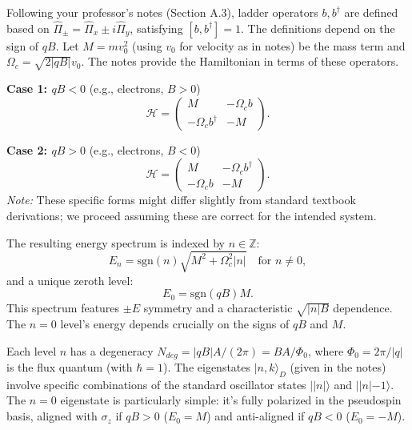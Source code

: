 \documentclass[11pt]{article}
\newcommand{\sgn}{\text{sgn}}
\newcommand{\Hc}{\mathcal{H}}       %
\begin{document}
Following your professor's notes (Section A.3), ladder operators $b, b^\dagger$ are defined based on $\hat{\Pi}_{\pm} = \hat{\Pi}_x \pm i \hat{\Pi}_y$, satisfying $[b, b^\dagger]=1$. The definitions depend on the sign of $qB$. Let $M = mv_0^2$ (using $v_0$ for velocity as in notes) be the mass term and $\Omega_c = \sqrt{2|qB|}v_0$. The notes provide the Hamiltonian in terms of these operators.

\textbf{Case 1: $qB < 0$} (e.g., electrons, $B>0$)
\begin{equation}
\Hc = \begin{pmatrix} M & -\Omega_{c} b \\ -\Omega_{c} b^{\dagger} & -M \end{pmatrix}.
\label{eq:H_LL_qBneg_notes}
\end{equation}

\textbf{Case 2: $qB > 0$} (e.g., electrons, $B<0$)
\begin{equation}
\Hc = \begin{pmatrix} M & -\Omega_{c} b^{\dagger} \\ -\Omega_{c} b & -M \end{pmatrix}.
\label{eq:H_LL_qBpos_notes}
\end{equation}
\textit{Note:} These specific forms might differ slightly from standard textbook derivations; we proceed assuming these are correct for the intended system.

The resulting energy spectrum is indexed by $n \in \mathbb{Z}$:
\begin{equation}
E_{n} = \sgn(n) \sqrt{M^2 + \Omega_c^2 |n|} \quad \text{for } n \neq 0,
\label{eq:LL_Dirac_n_nonzero_notes}
\end{equation}
and a unique zeroth level:
\begin{equation}
E_{0} = \sgn(qB) M.
\label{eq:LL_Dirac_n0_notes}
\end{equation}
This spectrum features $\pm E$ symmetry and a characteristic $\sqrt{|n|B}$ dependence. The $n=0$ level's energy depends crucially on the signs of $qB$ and $M$.

Each level $n$ has a degeneracy $N_{deg} = |qB|A / (2\pi) = BA/\Phi_0$, where $\Phi_0 = 2\pi/|q|$ is the flux quantum (with $\hbar=1$). The eigenstates $|n,k\rangle_D$ (given in the notes) involve specific combinations of the standard oscillator states $| |n| \rangle$ and $| |n|-1 \rangle$. The $n=0$ eigenstate is particularly simple: it's fully polarized in the pseudospin basis, aligned with $\sigma_z$ if $qB>0$ ($E_0=M$) and anti-aligned if $qB<0$ ($E_0=-M$).
\end{document}
